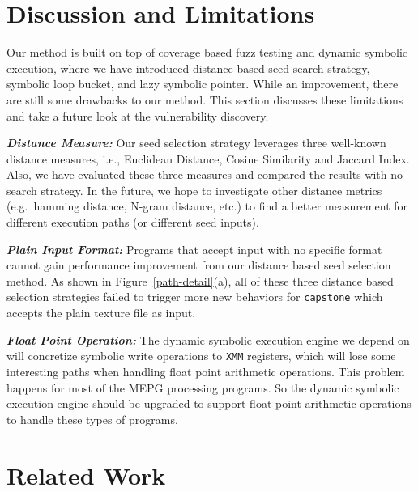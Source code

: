\documentclass{cta-author}
\begin{document}
\section{Discussion and Limitations} \label{sec:discussion}
Our method is built on top of coverage based fuzz testing and dynamic symbolic execution, where we have introduced distance based seed search strategy, symbolic loop bucket, and lazy symbolic pointer.
 While an improvement, there are still some drawbacks to our method. This section discusses these limitations and take a future look at the vulnerability discovery.

\noindent\textit{\textbf{Distance Measure:}} Our seed selection strategy leverages three well-known distance measures, i.e., Euclidean Distance, Cosine Similarity and Jaccard Index. Also, we have evaluated these three measures and compared the results with no search strategy. In the future, we hope to investigate other distance metrics (e.g.\ hamming distance, N-gram distance, etc.) to find a better measurement for different execution paths (or different seed inputs). 

\noindent\textit{\textbf{Plain Input Format:}} Programs that accept input with no specific format cannot gain performance improvement from our distance based seed selection method.
 As shown in Figure~\ref{path-detail}(a), all of these three distance based selection strategies failed to trigger more new behaviors for \texttt{capstone} which accepts the plain texture file as input. 

\noindent\textit{\textbf{Float Point Operation:}} The dynamic symbolic execution engine we depend on will concretize symbolic write operations to \texttt{XMM} registers, which will lose some interesting paths when handling float point arithmetic operations. This problem happens for most of the MEPG processing programs. So the dynamic symbolic execution engine should be upgraded to support float point arithmetic operations to handle these types of programs.


\section{Related Work} \label{sec:related}

\end{document}
